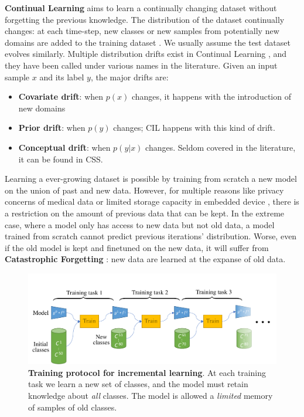 \textbf{Continual Learning} aims to learn a continually changing dataset without forgetting the
previous knowledge. The distribution of the dataset continually changes: \eg at each time-step, new
classes or new samples from potentially new domains are added to the training dataset
\citep{lomonaco2017core50}. We usually assume the test dataset evolves similarly. Multiple
distribution drifts exist in Continual Learning
\citep{morenotorresa2012datasetshift,lesort2021driftanalysis}, and they have been called under
various names in the literature. Given an input sample $x$ and its label $y$, the major drifts are:

\begin{itemize}
      \item \textbf{Covariate drift}: when $p(x)$ changes, it happens with the introduction of new
            domains \citep{volpi2021continualdomainadapt}
      \item \textbf{Prior drift}: when $p(y)$ changes; \ac{CIL} happens with this kind of drift.
      \item \textbf{Conceptual drift}: when $p(y | x)$ changes. Seldom covered in the literature, it
            can be found in \acf{CSS}.
\end{itemize}

Learning a ever-growing dataset is possible by training from scratch a new model on the union of
past and new data. However, for multiple reasons like privacy concerns of medical data or limited
storage capacity in embedded device \citep{vasquez2017incrementalneuralforest}, there is a
restriction on the amount of previous data that can be kept. In the extreme case, where a model only
has access to new data but not old data, a model trained from scratch cannot predict previous
iterations' distribution. Worse, even if the old model is kept and finetuned on the new data, it
will suffer from \textbf{Catastrophic Forgetting} \citep{robins1995catastrophicforgetting}: new data
are learned at the expanse of old data.

\begin{figure}[tb]
      \begin{center}
            \includegraphics[width=1.0\linewidth]{images/related/protocol}
      \end{center}
      \caption{\textbf{Training protocol for incremental learning}. At each training task we learn a
            new set of classes, and the model must retain knowledge about \textit{all} classes. The
            model is allowed a \textit{limited} memory of samples of old classes.}
      \label{fig:related_protocol}
\end{figure}

